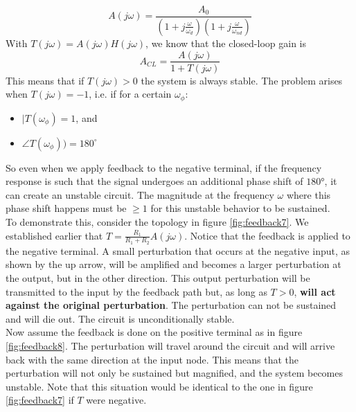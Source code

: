 $$
A(j \omega) = \frac{A_0}{(1 + j\frac{\omega}{\omega_d})(1 + j\frac{\omega}{\omega_{nd}})}
$$
With $T(j\omega) = A(j\omega) H(j\omega)$, we know that the closed-loop gain is
$$
A_{CL} = \frac{A(j\omega)}{1 + T(j\omega)}
$$
This means that if $T(j\omega) > 0$ the system is always stable. The problem arises when $T(j \omega) = -1$, i.e. if for a certain $\omega_\phi$:
\begin{itemize}
	\item $|T(\omega_\phi) = 1$, and
	\item $\angle T(\omega_\phi)) = 180^\circ$
\end{itemize}
So even when we apply feedback to the negative terminal, if the frequency response is such that the signal undergoes an additional phase shift of $180$°, it can create an unstable circuit. The magnitude at the frequency $\omega$ where this phase shift happens must be $\ge 1$ for this unstable behavior to be sustained.\\
To demonstrate this, consider the topology in figure \ref{fig:feedback7}. We established earlier that $T = \frac{R_1}{R_1 + R_2} A(j\omega)$. Notice that the feedback is applied to the negative terminal. A small perturbation that occurs at the negative input, as shown by the up arrow, will be amplified and becomes a larger perturbation at the output, but in the other direction. This output perturbation will be transmitted to the input by the feedback path but, as long as $T > 0$, \textbf{will act against the original perturbation}. The perturbation can not be sustained and will die out. The circuit is unconditionally stable.\\
Now assume the feedback is done on the positive terminal as in figure \ref{fig:feedback8}. The perturbation will travel around the circuit and will arrive back with the same direction at the input node. This means that the perturbation will not only be sustained but magnified, and the system becomes unstable. Note that this situation would be identical to the one in figure \ref{fig:feedback7} if $T$ were negative.\\


